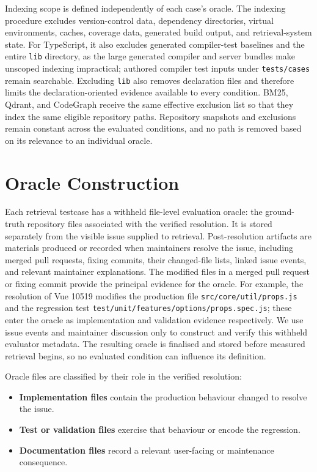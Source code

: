 Indexing scope is defined independently of each case's oracle. The indexing procedure excludes version-control data, dependency directories, virtual environments, caches, coverage data, generated build output, and retrieval-system state. For TypeScript, it also excludes generated compiler-test baselines and the entire \texttt{lib} directory, as the large generated compiler and server bundles make unscoped indexing impractical; authored compiler test inputs under \texttt{tests/cases} remain searchable. Excluding \texttt{lib} also removes declaration files and therefore limits the declaration-oriented evidence available to every condition. BM25, Qdrant, and CodeGraph receive the same effective exclusion list so that they index the same eligible repository paths. Repository snapshots and exclusions remain constant across the evaluated conditions, and no path is removed based on its relevance to an individual oracle.

\section{Oracle Construction}\label{sec:oracle-construction}

Each retrieval testcase has a withheld file-level evaluation oracle: the ground-truth repository files associated with the verified resolution. It is stored separately from the visible issue supplied to retrieval. Post-resolution artifacts are materials produced or recorded when maintainers resolve the issue, including merged pull requests, fixing commits, their changed-file lists, linked issue events, and relevant maintainer explanations. The modified files in a merged pull request or fixing commit provide the principal evidence for the oracle. For example, the resolution of Vue 10519 modifies the production file \texttt{src/core/util/props.js} and the regression test \texttt{test/unit/features/options/props.spec.js}; these enter the oracle as implementation and validation evidence respectively. We use issue events and maintainer discussion only to construct and verify this withheld evaluator metadata. The resulting oracle is finalised and stored before measured retrieval begins, so no evaluated condition can influence its definition.

Oracle files are classified by their role in the verified resolution:

\begin{itemize}
\item \textbf{Implementation files} contain the production behaviour changed to resolve the issue.
\item \textbf{Test or validation files} exercise that behaviour or encode the regression.
\item \textbf{Documentation files} record a relevant user-facing or maintenance consequence.
\end{itemize}


